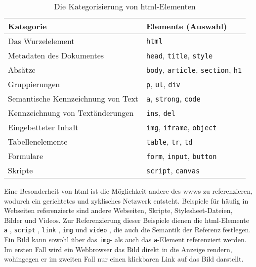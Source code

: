             \begin{table}[h]
                \centering
                \begin{tabular}{|l|l|}
                \hline
                \textbf{Kategorie} & \textbf{Elemente (Auswahl)} \\
                \hline
                Das Wurzelelement & \texttt{html} \\
                \hline
                Metadaten des Dokumentes & \texttt{head}, \texttt{title}, \texttt{style} \\
                \hline
                Absätze & \texttt{body}, \texttt{article}, \texttt{section}, \texttt{h1} \\
                \hline
                Gruppierungen & \texttt{p}, \texttt{ul}, \texttt{div} \\
                \hline
                Semantische Kennzeichnung von Text & \texttt{a}, \texttt{strong}, \texttt{code} \\
                \hline
                Kennzeichnung von Textänderungen & \texttt{ins}, \texttt{del} \\
                \hline
                Eingebetteter Inhalt & \texttt{img}, \texttt{iframe}, \texttt{object} \\
                \hline
                Tabellenelemente & \texttt{table}, \texttt{tr}, \texttt{td} \\
                \hline
                Formulare & \texttt{form}, \texttt{input}, \texttt{button} \\
                \hline
                Skripte & \texttt{script}, \texttt{canvas} \\
                \hline
                \end{tabular}
                \caption{Die Kategorisierung von \acrshort{html}-Elementen}
                \label{table:htmlElements}
            \end{table}
        
            Eine Besonderheit von \gls{html} ist die Möglichkeit
            andere {\resources} des \glspl{www} zu referenzieren,
            wodurch ein gerichtetes und zyklisches Netzwerk entsteht.
            Beispiele für häufig in Webseiten referenzierte {\resources}
            sind andere Webseiten, Skripte, Stylesheet-Dateien, Bilder und Videos.
            Zur Referenzierung dieser Beispiele dienen die \gls{html}-Elemente
            \texttt{a} \cite[Kapitel 4.5.1]{w3c:html5},
            \texttt{script} \cite[Kapitel 4.11.1]{w3c:html5},
            \texttt{link} \cite[Kapitel 4.2.4]{w3c:html5},
            \texttt{img} \cite[Kapitel 4.7.1]{w3c:html5} und
            \texttt{video} \cite[Kapitel 4.7.6]{w3c:html5},
            die auch die Semantik der Referenz festlegen.
            Ein Bild kann sowohl über das \texttt{img}-
            als auch das \texttt{a}-Element referenziert werden.
            Im ersten Fall wird ein Webbrowser das Bild direkt in die Anzeige rendern,
            wohingegen er im zweiten Fall nur einen klickbaren Link auf das Bild darstellt.

